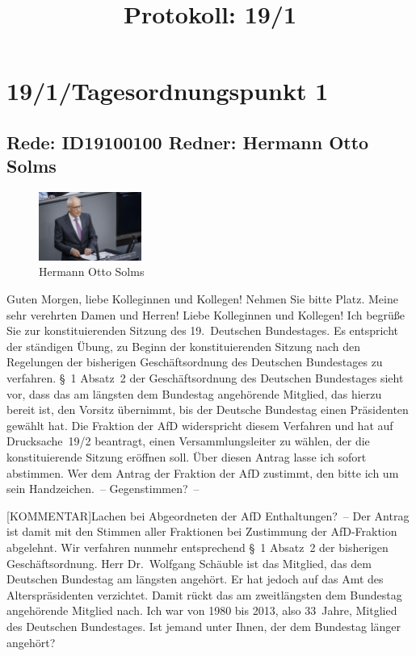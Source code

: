 \documentclass[a4paper,11pt]{article}
\title{Protokoll: 19/1}
\begin{document}
\maketitle

\tableofcontents

\section{19/1/Tagesordnungspunkt 1} 

\subsection{Rede: ID19100100  Redner: Hermann Otto Solms}

\begin{figure}[ht]

\centering

\includegraphics[width=0.3\textwidth]{Hermann_Otto_Solms.jpg}

\caption{Hermann Otto Solms}

\end{figure}

Guten Morgen, liebe Kolleginnen und Kollegen! Nehmen Sie bitte Platz. Meine sehr verehrten Damen und Herren! Liebe Kolleginnen und Kollegen! Ich begrüße Sie zur konstituierenden Sitzung des 19. Deutschen Bundestages. Es entspricht der ständigen Übung, zu Beginn der konstituierenden Sitzung nach den Regelungen der bisherigen Geschäftsordnung des Deutschen Bundestages zu verfahren. § 1 Absatz 2 der Geschäftsordnung des Deutschen Bundestages sieht vor, dass das am längsten dem Bundestag angehörende Mitglied, das hierzu bereit ist, den Vorsitz übernimmt, bis der Deutsche Bundestag einen Präsidenten gewählt hat. Die Fraktion der AfD widerspricht diesem Verfahren und hat auf Drucksache 19/2 beantragt, einen Versammlungsleiter zu wählen, der die konstituierende Sitzung eröffnen soll. Über diesen Antrag lasse ich sofort abstimmen. Wer dem Antrag der Fraktion der AfD zustimmt, den bitte ich um sein Handzeichen. – Gegenstimmen? –

[KOMMENTAR]Lachen bei Abgeordneten der AfD
 Enthaltungen? – Der Antrag ist damit mit den Stimmen aller Fraktionen bei Zustimmung der AfD-Fraktion abgelehnt. Wir verfahren nunmehr entsprechend § 1 Absatz 2 der bisherigen Geschäftsordnung. Herr Dr. Wolfgang Schäuble ist das Mitglied, das dem Deutschen Bundestag am längsten angehört. Er hat jedoch auf das Amt des Alterspräsidenten verzichtet. Damit rückt das am zweitlängsten dem Bundestag angehörende Mitglied nach. Ich war von 1980 bis 2013, also 33 Jahre, Mitglied des Deutschen Bundestages. Ist jemand unter Ihnen, der dem Bundestag länger angehört? 
\end{document}
